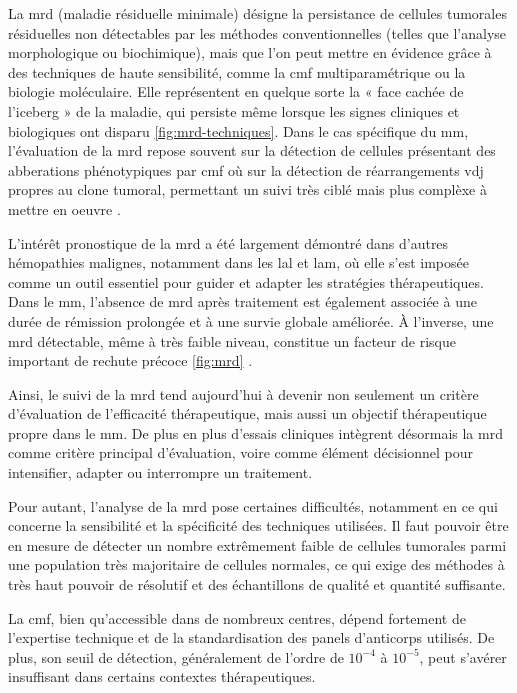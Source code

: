 La \gls{mrd} (maladie résiduelle minimale) désigne la persistance de cellules tumorales résiduelles non détectables 
par les méthodes conventionnelles (telles que l'analyse morphologique ou biochimique), mais que l'on peut mettre en évidence 
grâce à des techniques de haute sensibilité, comme la \gls{cmf} multiparamétrique ou la biologie moléculaire. Elle représentent 
en quelque sorte la « face cachée de l'iceberg » de la maladie, qui persiste même lorsque les signes cliniques et biologiques 
ont disparu \autoref{fig:mrd-techniques}.
Dans le cas spécifique du \gls{mm}, l'évaluation de la \gls{mrd} repose souvent sur la détection de cellules présentant des 
abberations phénotypiques par \gls{cmf} où sur la détection de réarrangements \gls{vdj} propres au clone tumoral, permettant un suivi très ciblé 
mais plus complèxe à mettre en oeuvre \cite{bertaminiMRDAssessmentMultiple2021}.



L'intérêt pronostique de la \gls{mrd} a été largement démontré dans d'autres hémopathies malignes, notamment dans les \gls{lal} et \gls{lam}, 
où elle s'est imposée comme un outil essentiel pour guider et adapter les stratégies thérapeutiques. Dans le \gls{mm}, l'absence de \gls{mrd} 
après traitement est également associée à une durée de rémission prolongée et à une survie globale améliorée. À l'inverse, une \gls{mrd} détectable, 
même à très faible niveau, constitue un facteur de risque important de rechute précoce \autoref{fig:mrd}
\cite{munshiLargeMetaanalysisEstablishes2020}.

Ainsi, le suivi de la \gls{mrd} tend aujourd'hui à devenir non seulement un critère d'évaluation de l'efficacité thérapeutique, mais aussi un objectif 
thérapeutique propre dans le \gls{mm}. De plus en plus d'essais cliniques intègrent désormais la \gls{mrd} comme critère principal d'évaluation, 
voire comme élément décisionnel pour intensifier, adapter ou interrompre un traitement.



Pour autant, l'analyse de la \gls{mrd} pose certaines difficultés, notamment en ce qui concerne la sensibilité et la spécificité des techniques utilisées.
Il faut pouvoir être en mesure de détecter un nombre extrêmement faible de cellules tumorales parmi une population très majoritaire de cellules normales,
ce qui exige des méthodes à très haut pouvoir de résolutif et des échantillons de qualité et quantité suffisante.

La \gls{cmf}, bien qu'accessible dans de nombreux centres, dépend fortement de l'expertise technique et de la standardisation
des panels d'anticorps utilisés. De plus, son seuil de détection, généralement de l'ordre de $10^{-4}$ à $10^{-5}$, peut s'avérer insuffisant dans certains contextes
thérapeutiques.

